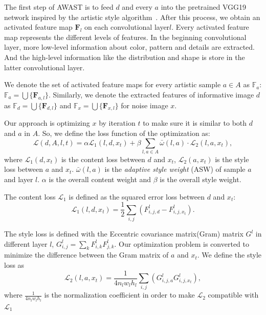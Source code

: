 \documentclass[10pt,twocolumn,letterpaper]{article}
\begin{document}
The first step of AWAST is to feed $d$ and every $a$ into the pretrained VGG19 network inspired by the artistic style algorithm~\cite{gatys2015neural}. After this process, we obtain an activated feature map $\bm{F}_l$ on each convolutional layer$l$. Every activated feature map represents the different levels of features. In the beginning convolutional layer, more low-level information about color, pattern and details are extracted. And the high-level information like the distribution and shape is store in the latter convolutional layer.

We denote the set of activated feature maps for every artistic sample $a\in A$ as $\mathbb{F}_a$: $\mathbb{F}_a = \bigcup\{\bm{F}_{a,l}\}$. Similarly, we denote the extracted features of informative image $d$ as $\mathbb{F}_d = \bigcup\{\bm{F}_{d,l}\}$ and $\mathbb{F}_x = \bigcup\{\bm{F}_{x,l}\}$ for noise image $x$.

Our approach is optimizing $x$ by iteration $t$ to make sure it is similar to both $d$ and $a$ in $A$. So, we define the loss function of the optimization as:
\begin{equation}
\mathcal{L}(d, A, l, t) = \alpha \mathcal{L}_{1}(l, d, x_t) + \beta \sum_{l, a\in A}\bar{\omega}(l, a)\cdot \mathcal{L}_{2}(l, a, x_t),
\end{equation}\label{equ::overallloss}
where $\mathcal{L}_1(d, x_t)$ is the content loss between $d$ and $x_t$, $\mathcal{L}_2(a, x_t)$ is the style loss between $a$ and $x_t$. $\bar{\omega}(l, a)$ is the \textit{adaptive style weight} (ASW) of sample $a$ and layer $l$. $\alpha$ is the overall content weight and $\beta$ is the overall style weight.

The content loss $\mathcal{L}_1$ is defined as the squared error loss between $d$ and $x_t$: \begin{equation}
\mathcal{L}_1(l, d, x_t) = \frac{1}{2}\sum_{i,j}(F_{i, j, d}^{l}-F_{i, j, x_t}^{l}).
\end{equation}

The style loss is defined with the Eccentric covariance matrix(Gram) matrix $G^l$ in different layer $l$, $G^l_{i, j} = \sum_{k} F_{i, k}^l F_{j,k}^l$. Our optimization problem is converted to minimize the difference between the Gram matrix of $a$ and $x_t$. We define the style loss as
\begin{equation}
\mathcal{L}_2(l, a, x_t) = {\frac{1}{4n_lw_lh_l}\sum_{i,j}(G_{i, j, a}^{l} G_{i, j, x_t}^l)},
\end{equation}
where $\frac{1}{4n_lw_lh_l}$ is the normalization coefficient in order to make $\mathcal{L}_2$ compatible with $\mathcal{L}_1$
\end{document}
